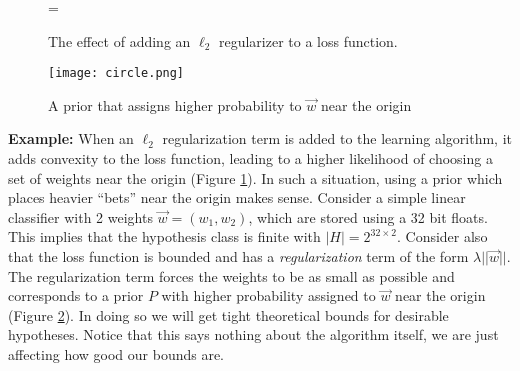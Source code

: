 \documentclass{article}
\begin{document}
\begin{figure}[H]
    =
    \caption{The effect of adding an $\ell_2$ regularizer to a loss function.}
    \label{fig:l2_reg}
\end{figure}

\begin{figure}[H]
    \captionsetup{justification=centering}
	\texttt{[image: circle.png]}
    \caption{A prior that assigns higher probability to $\Vec{w}$ near the origin}
    \label{fig:circle}
\end{figure}
\vspace*{0.5cm}

\textbf{Example:} When an $\ell_2$ regularization term is added to the learning algorithm, it adds convexity to the loss function, leading to a higher likelihood of choosing a set of weights near the origin (Figure \ref{fig:l2_reg}). In such a situation, using a prior which places heavier ``bets'' near the origin makes sense. Consider a simple linear classifier with 2 weights $\Vec{w} = (w_1, w_2)$, which are stored using a 32 bit floats. This implies that the hypothesis class is finite with $|H|=2^{32 \times 2}$. Consider also that the loss function is bounded and has a \emph{regularization} term of the form $\lambda||\Vec{w}||$. The regularization term forces the weights to be as small as possible and corresponds to a prior $P$ with higher probability assigned to $\Vec{w}$ near the origin (Figure \ref{fig:circle}). In doing so we will get tight theoretical bounds for desirable hypotheses. Notice that this says nothing about the algorithm itself, we are just affecting how good our bounds are.
\end{document}
